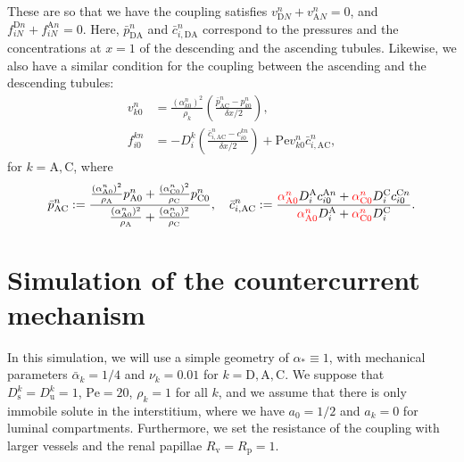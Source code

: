\documentclass{article}
\begin{document}
These are so that we have the coupling satisfies $v_{\mathrm{D} N}^n+v_{\mathrm{A} N}^n = 0$, and $f_{iN}^{\mathrm{D}n}+ f_{iN}^{\mathrm{A}n} = 0$.
Here, $\bar{p}_{\mathrm{DA}}^n$ and $\bar{c}_{i,\mathrm{DA}}^n$ correspond to the pressures and the concentrations at $x=1$ of the descending and the ascending tubules.
Likewise, we also have a similar condition for the coupling between the ascending and the descending tubules:
\begin{align}
    v_{k0}^n &= \frac{(\alpha_{k0}^n)^2}{\rho_k}\left( \frac{\bar{p}_{\mathrm{AC}}^n-p_{k0}^n}{\delta x/2} \right),\\ 
    f_{i0}^{kn} &= -D_i^k\left( \frac{\bar{c}_{i,\mathrm{AC}}^{n}- c_{i0}^{kn}}{\delta x/2} \right)+\mathrm{Pe}v_{k0}^{n}\bar{c}_{i,\mathrm{AC}}^{n},
\end{align}
    for $k=\mathrm{A},\mathrm{C}$, where
\begin{equation}
    \bar{p}_{\mathrm{AC}}^n:=\frac{\frac{(\alpha_{\mathrm{A} 0}^n)^2}{\rho_\mathrm{A} }p_{\mathrm{A} 0}^n+\frac{(\alpha_{\mathrm{C} 0}^n)^2}{\rho_\mathrm{C} }p_{\mathrm{C} 0}^n}{\frac{(\alpha_{\mathrm{A} 0}^n)^2}{\rho_\mathrm{A} }+\frac{(\alpha_{\mathrm{C} 0}^n)^2}{\rho_\mathrm{C} }},\quad 
    \bar{c}_{i,\mathrm{AC}}^n:=\frac{{\color{red}\alpha_{\mathrm{A} 0}^n}D_i^\mathrm{A} c_{i0}^{\mathrm{A} n}+{\color{red}\alpha_{\mathrm{C} 0}^n}D_i^\mathrm{C} c_{i0}^{\mathrm{C} n}}{{\color{red}\alpha_{\mathrm{A} 0}^n}D_i^\mathrm{A} +{\color{red}\alpha_{\mathrm{C} 0}^n}D_i^\mathrm{C} }.
\end{equation}


\section{Simulation of the countercurrent mechanism}

In this simulation, we will use a simple geometry of $\alpha_* \equiv 1$, with mechanical parameters $\bar{\alpha}_k = 1/4$ and $\nu_k = 0.01$ for $k=\mathrm{D},\mathrm{A},\mathrm{C}$.
We suppose that $D_\mathrm{s}^k = D_{\mathrm{u}}^k = 1$, $\mathrm{Pe} = 20$, $\rho_k = 1$ for all $k$, and we assume that there is only immobile solute in the interstitium, where we have $a_0 = 1/2$ and $a_k = 0$ for luminal compartments.
Furthermore, we set the resistance of the coupling with larger vessels and the renal papillae $R_\mathrm{v} = R_\mathrm{p} = 1$.
\end{document}
